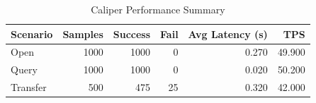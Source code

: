 \begin{table}
\caption{Caliper Performance Summary}
\label{tab:caliper_round}
\begin{tabular}{lrrrrr}
\toprule
Scenario & Samples & Success & Fail & Avg Latency (s) & TPS \\
\midrule
Open & 1000 & 1000 & 0 & 0.270 & 49.900 \\
Query & 1000 & 1000 & 0 & 0.020 & 50.200 \\
Transfer & 500 & 475 & 25 & 0.320 & 42.000 \\
\bottomrule
\end{tabular}
\end{table}
